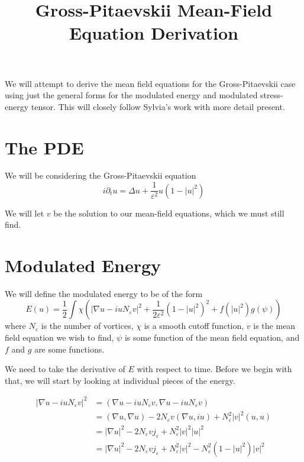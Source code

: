 \documentclass[a4paper]{article}
\title{Gross-Pitaevskii Mean-Field Equation Derivation}
\date{}
\author{}
\begin{document}
\maketitle
We will attempt to derive the mean field equations for the Gross-Pitaevskii case using just the general forms for the modulated energy and modulated
stress-energy tensor. This will closely follow Sylvia's work with more detail present.

\section{The PDE}
We will be considering the Gross-Pitaevskii equation
\begin{equation} \label{GP}
  i \partial_t u = \Delta u + \frac{1}{\varepsilon^2} u (1-|u|^2)
\end{equation}

We will let $v$ be the solution to our mean-field equations, which we must still find.

\section{Modulated Energy}
We will define the modulated energy to be of the form
\begin{equation} \label{eqn:mod_energy_form}
  E(u) = \frac{1}{2} \int \chi \left( |\nabla u - i uN_\varepsilon v|^2 + \frac{1}{2\varepsilon^2} (1-|u|^2)^2 + f(|u|^2) g(\psi) \right)
\end{equation}
where $N_\varepsilon$ is the number of vortices, $\chi$ is a smooth cutoff function, $v$ is the mean field equation we wish to find, $\psi$ is some
function of the mean field equation, and $f$ and $g$ are some functions.

We need to take the derivative of $E$ with respect to time. Before we begin with that, we will start by looking at individual pieces of the energy.

\begin{align}
  | \nabla u - i u N_\varepsilon v|^2 &= (\nabla u - i u N_\varepsilon v, \nabla u - i u N_\varepsilon v) \nonumber \\
  &= (\nabla u, \nabla u) - 2N_\varepsilon v ( \nabla u, iu ) + N_\varepsilon^2 |v|^2 (u,u) \nonumber \\
  &= |\nabla u|^2 - 2 N_\varepsilon v j_\varepsilon + N_\varepsilon^2 |v|^2 |u|^2 \nonumber \\
  &= |\nabla u|^2 - 2N_\varepsilon v j_\varepsilon + N_\varepsilon^2 |v|^2 - N_\varepsilon^2 (1 - |u|^2)|v|^2
  \label{eqn:mod_grad}
\end{align}
\end{document}
